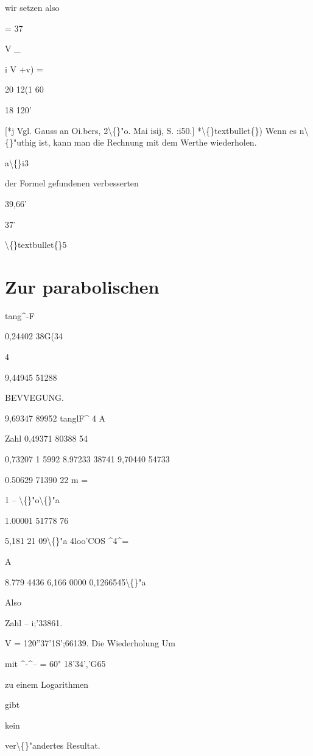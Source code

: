 \documentclass[10pt,a4paper]{article}
\begin{document}
wir setzen also

=
37

V \_

i V +v) =

20
12(1
60

18
120'

[*j Vgl. Gauss an Oi.bers, 2\textbackslash\{\}"o. Mai isij, S. :i50.]
*\textbackslash\{\}textbullet\{\}) Wenn es n\textbackslash\{\}"uthig ist, kann man die Rechnung mit dem
Werthe wiederholen.

a\textbackslash\{\}i3

der Formel gefundenen verbesserten

39,66'

37'

\textbackslash\{\}textbullet\{\}5

\newpage
\section*{Zur parabolischen}

tang\textasciicircum{}-F

0,24402 38G(34

4

9,44945 51288

BEVVEGUNG.

9,69347 89952
tanglF\textasciicircum{}
4
A


Zahl 0,49371 80388 54

0,73207 1 5992
8.97233 38741
9,70440 54733

0.50629 71390 22
m =

1 -- \textbackslash\{\}"o\textbackslash\{\}"a

1.00001 51778 76

5,181 21 09\textbackslash\{\}"a
4loo'COS \textasciicircum{}4\textasciicircum{}=

A

8.779 4436
6,166 0000
0,1266545\textbackslash\{\}"a

Also

Zahl -- i;'33861.

V = 120''37'1S';66139.
Die Wiederholung
Um

mit \textasciicircum{}-\textasciicircum{}-- = 60" 18'34','G65

zu einem Logarithmen

gibt

kein

ver\textbackslash\{\}"andertes Resultat.
\end{document}
